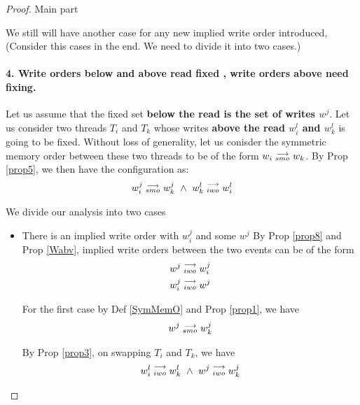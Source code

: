 \begin{proof}{Main part}
\begin{itemize}
\begin{enumerate}
\begin{itemize}
                                \end{itemize}

                        \end{enumerate}

                \end{itemize}
            
            We still will have another case for any new implied write order introduced, (Consider this cases in the end. We need to divide it into two cases.)
            \paragraph{4. Write orders below and above read fixed , write orders above need fixing.} 
                
                Let us assume that the fixed set \textbf{below the read is the set of writes $w^j$}. Let us consider two threads $T_i$ and $T_k$ whose writes \textbf{above the read $w_i^l$ and $w_k^l$} is going to be fixed. Without loss of generality, let us conisder the symmetric memory order between these two threads to be of the form $w_i\stackrel{\longrightarrow}{_{smo}}w_k$.  By Prop \ref{prop5}, we then have the configuration as:
                \begin{align*}
                    \reln{w_i^j}{smo}{w_k^j} \ \wedge \ \reln{w_k^l}{iwo}{w_i^l}
                \end{align*}

                We divide our analysis into two cases 
                \begin{itemize}
                    \item There is an implied write order with $w_i^j$ and some $w^j$
                        By Prop \ref{prop8} and Prop \ref{Wabv}, implied write orders between the two events can be of the form 
                        \begin{align*}
                            w^j\stackrel{\longrightarrow}{_{iwo}}w_i^j \\
                            w_i^j\stackrel{\longrightarrow}{_{iwo}}w^j 
                        \end{align*}

                        For the first case by Def \ref{SymMemO} and Prop \ref{prop1}, we have
                        \begin{align*}
                            w^j\stackrel{\longrightarrow}{_{smo}}w_k^j
                        \end{align*}

                        By Prop \ref{prop3}, on swapping $T_i$ and $T_k$, we have 
                        \begin{align*}
                            \reln{w_i^l}{iwo}{w_k^l} \ \wedge \ \reln{w^j}{iwo}{w_k^j}
                        \end{align*}


\end{itemize}
\end{proof}
